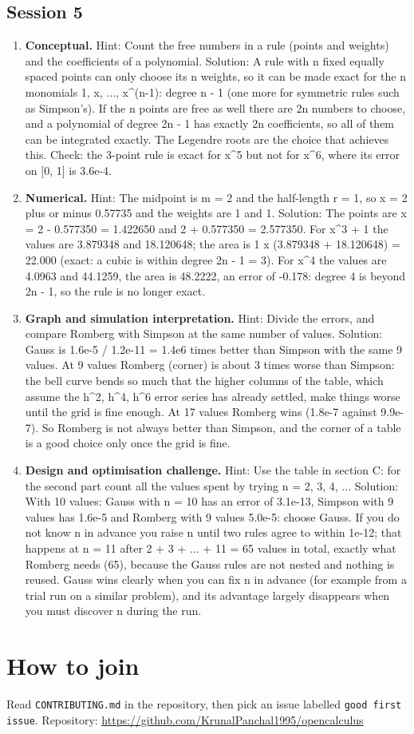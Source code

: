 \documentclass[11pt,a4paper]{article}
\begin{document}
\subsection*{Session 5}
\begin{enumerate}[nosep]
\item \textbf{Conceptual.} Hint: Count the free numbers in a rule (points and weights) and the coefficients of a polynomial. Solution: A rule with n fixed equally spaced points can only choose its n weights, so it can be made exact for the n monomials 1, x, ..., x\textasciicircum{}(n-1): degree n - 1 (one more for symmetric rules such as Simpson's). If the n points are free as well there are 2n numbers to choose, and a polynomial of degree 2n - 1 has exactly 2n coefficients, so all of them can be integrated exactly. The Legendre roots are the choice that achieves this. Check: the 3-point rule is exact for x\textasciicircum{}5 but not for x\textasciicircum{}6, where its error on [0, 1] is 3.6e-4.
\item \textbf{Numerical.} Hint: The midpoint is m = 2 and the half-length r = 1, so x = 2 plus or minus 0.57735 and the weights are 1 and 1. Solution: The points are x = 2 - 0.577350 = 1.422650 and 2 + 0.577350 = 2.577350. For x\textasciicircum{}3 + 1 the values are 3.879348 and 18.120648; the area is 1 x (3.879348 + 18.120648) = 22.000 (exact: a cubic is within degree 2n - 1 = 3). For x\textasciicircum{}4 the values are 4.0963 and 44.1259, the area is 48.2222, an error of -0.178: degree 4 is beyond 2n - 1, so the rule is no longer exact.
\item \textbf{Graph and simulation interpretation.} Hint: Divide the errors, and compare Romberg with Simpson at the same number of values. Solution: Gauss is 1.6e-5 / 1.2e-11 = 1.4e6 times better than Simpson with the same 9 values. At 9 values Romberg (corner) is about 3 times worse than Simpson: the bell curve bends so much that the higher columns of the table, which assume the h\textasciicircum{}2, h\textasciicircum{}4, h\textasciicircum{}6 error series has already settled, make things worse until the grid is fine enough. At 17 values Romberg wins (1.8e-7 against 9.9e-7). So Romberg is not always better than Simpson, and the corner of a table is a good choice only once the grid is fine.
\item \textbf{Design and optimisation challenge.} Hint: Use the table in section C: for the second part count all the values spent by trying n = 2, 3, 4, ... Solution: With 10 values: Gauss with n = 10 has an error of 3.1e-13, Simpson with 9 values has 1.6e-5 and Romberg with 9 values 5.0e-5: choose Gauss. If you do not know n in advance you raise n until two rules agree to within 1e-12; that happens at n = 11 after 2 + 3 + ... + 11 = 65 values in total, exactly what Romberg needs (65), because the Gauss rules are not nested and nothing is reused. Gauss wins clearly when you can fix n in advance (for example from a trial run on a similar problem), and its advantage largely disappears when you must discover n during the run.
\end{enumerate}

\section{How to join}
Read \texttt{CONTRIBUTING.md} in the repository, then pick an issue labelled \texttt{good first issue}. Repository: \url{https://github.com/KrunalPanchal1995/opencalculus}
\end{document}
